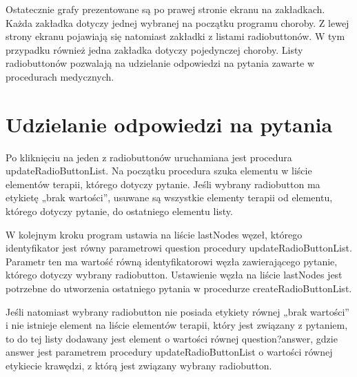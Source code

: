Ostatecznie grafy prezentowane są po prawej stronie ekranu na zakładkach. Każda zakładka dotyczy jednej wybranej na początku programu choroby. Z lewej strony ekranu pojawiają się natomiast zakładki z listami radiobuttonów. W tym przypadku również jedna zakładka dotyczy pojedynczej choroby. Listy radiobuttonów pozwalają na udzielanie odpowiedzi na pytania zawarte w procedurach medycznych.


\section{Udzielanie odpowiedzi na pytania}

Po kliknięciu na jeden z radiobuttonów uruchamiana jest procedura updateRadioButtonList. Na początku procedura szuka elementu w liście elementów terapii, którego dotyczy pytanie. Jeśli wybrany radiobutton ma etykietę „brak wartości”, usuwane są wszystkie elementy terapii od elementu, którego dotyczy pytanie, do ostatniego elementu listy. 

W kolejnym kroku program ustawia na liście lastNodes węzeł, którego identyfikator jest równy parametrowi question procedury updateRadioButtonList. 
Parametr ten ma wartość równą identyfikatorowi węzła zawierającego pytanie, którego dotyczy wybrany radiobutton. 
Ustawienie węzła na liście lastNodes jest potrzebne do utworzenia ostatniego pytania w procedurze createRadioButtonList. 

Jeśli natomiast wybrany radiobutton nie posiada etykiety równej „brak wartości” i nie istnieje element na liście elementów terapii, który jest związany z pytaniem, to do tej listy dodawany jest element o wartości równej question?answer, gdzie answer jest parametrem procedury updateRadioButtonList o wartości równej etykiecie krawędzi, z którą jest związany wybrany radiobutton. 

